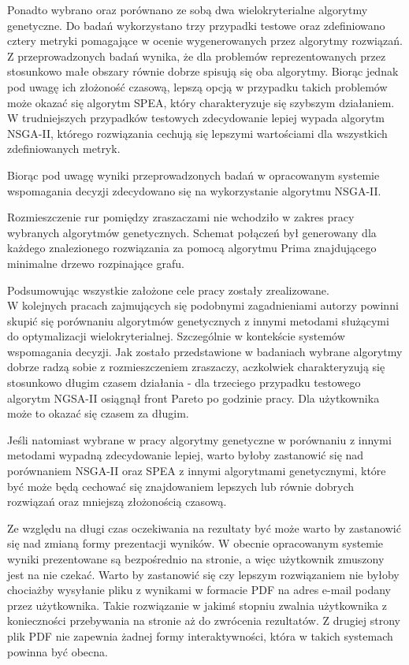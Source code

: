 \documentclass[twoside]{iisthesis}
\begin{document}
Ponadto wybrano oraz porównano ze sobą dwa wielokryterialne algorytmy genetyczne. Do badań wykorzystano trzy przypadki testowe oraz zdefiniowano cztery metryki pomagające w ocenie wygenerowanych przez algorytmy rozwiązań. Z przeprowadzonych badań wynika, że dla problemów reprezentowanych przez stosunkowo małe obszary równie dobrze spisują się oba algorytmy. Biorąc jednak pod uwagę ich złożoność czasową, lepszą opcją w przypadku takich problemów może okazać się algorytm SPEA, który charakteryzuje się szybszym działaniem. W trudniejszych przypadków testowych zdecydowanie lepiej wypada algorytm NSGA-II, którego rozwiązania cechują się lepszymi wartościami dla wszystkich zdefiniowanych metryk.

Biorąc pod uwagę wyniki przeprowadzonych badań w opracowanym systemie wspomagania decyzji zdecydowano się na wykorzystanie algorytmu NSGA-II.

Rozmieszczenie rur pomiędzy zraszaczami nie wchodziło w zakres pracy wybranych algorytmów genetycznych. Schemat połączeń był generowany dla każdego znalezionego rozwiązania za pomocą algorytmu Prima znajdującego minimalne drzewo rozpinające grafu.

Podsumowując wszystkie założone cele pracy zostały zrealizowane.\\

W kolejnych pracach zajmujących się podobnymi zagadnieniami autorzy powinni skupić się porównaniu algorytmów genetycznych z innymi metodami służącymi do optymalizacji wielokryterialnej. Szczególnie w kontekście systemów wspomagania decyzji. Jak zostało przedstawione w badaniach wybrane algorytmy dobrze radzą sobie z rozmieszczeniem zraszaczy, aczkolwiek charakteryzują się stosunkowo długim czasem działania - dla trzeciego przypadku testowego algorytm NGSA-II osiągnął front Pareto po godzinie pracy. Dla użytkownika może to okazać się czasem za długim. 

Jeśli natomiast wybrane w pracy algorytmy genetyczne w porównaniu z innymi metodami wypadną zdecydowanie lepiej, warto byłoby zastanowić się nad porównaniem NSGA-II oraz SPEA z innymi algorytmami genetycznymi, które być może będą cechować się znajdowaniem lepszych lub równie dobrych rozwiązań oraz mniejszą złożonością czasową.

Ze względu na długi czas oczekiwania na rezultaty być może warto by zastanowić się nad zmianą formy prezentacji wyników. W obecnie opracowanym systemie wyniki prezentowane są bezpośrednio na stronie, a więc użytkownik zmuszony jest na nie czekać. Warto by zastanowić się czy lepszym rozwiązaniem nie byłoby chociażby wysyłanie pliku z wynikami w formacie PDF na adres e-mail podany przez użytkownika. Takie rozwiązanie w jakimś stopniu zwalnia użytkownika z konieczności przebywania na stronie aż do zwrócenia rezultatów. Z drugiej strony plik PDF nie zapewnia żadnej formy interaktywności, która w takich systemach powinna być obecna.
\end{document}
